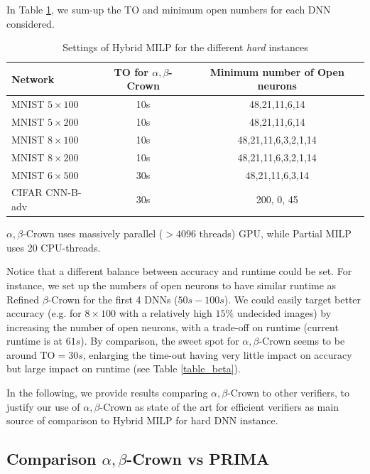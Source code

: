 In Table \ref{table20}, we sum-up the TO and minimum open numbers for each DNN considered.
\begin{table}[h!]
	\centering
	\begin{tabular}{||l||c|c||}
		\hline \hline
		Network & TO for $\alpha,\beta$-Crown  & Minimum number of Open neurons  \\ 		  
		\hline
		MNIST $5 \times 100$ & 10s  & 48,21,11,6,14  \\ \hline
		MNIST $5 \times 200$ & 10s & 48,21,11,6,14  \\ \hline
		MNIST $8 \times 100$ & 10s  & 48,21,11,6,3,2,1,14  \\ \hline
		MNIST $8 \times 200$ & 10s & 48,21,11,6,3,2,1,14  \\ \hline
		MNIST $6 \times 500$ & 30s & 48,21,11,6,3,14 \\ \hline
		CIFAR CNN-B-adv & 30s & 200, 0, 45 \\ \hline \hline
	\end{tabular}
	\caption{Settings of Hybrid MILP for the different {\em hard} instances}
	\label{table20}
	\end{table}


$\alpha,\beta$-Crown uses massively parallel ($>4096$ threads) GPU, while Partial MILP uses 20 CPU-threads.

Notice that a different balance between accuracy and runtime could be set. For instance, we set up the numbers of open neurons to have similar runtime as Refined $\beta$-Crown for the first 4 DNNs ($50s-100s$). We could easily target better accuracy (e.g. for $8 \times 100$ with a relatively high $15\%$ undecided images) by increasing the number of open neurons, with a trade-off on runtime (current runtime is at $61s$).
By comparison, the sweet spot for $\alpha,\beta$-Crown seems to be around TO$=30s$, enlarging the time-out having very little impact on accuracy but large impact on runtime
(see Table \ref{table_beta}).

\medskip
In the following, we provide results comparing $\alpha,\beta$-Crown to other verifiers, to justify our use of $\alpha,\beta$-Crown as state of the art for efficient verifiers as main source of comparison to Hybrid MILP for hard DNN instance.

\newpage 

\subsection*{Comparison $\alpha,\beta$-Crown vs PRIMA}

